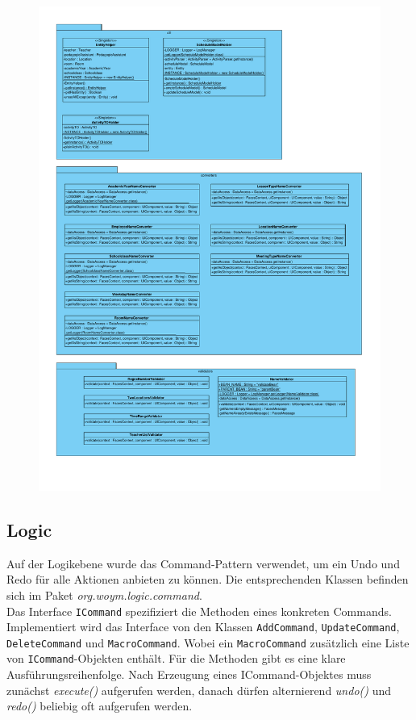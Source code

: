 \documentclass[fontsize=12pt,paper=a4,twoside]{scrartcl}
\begin{document}
\begin{figure}[H]
\centering
\includegraphics[width=\textwidth]{ui.pdf}
\end{figure}

\subsection{Logic}
\label{subsec:logic}
Auf der Logikebene wurde das Command-Pattern verwendet, um ein Undo und Redo für alle Aktionen anbieten zu können. Die entsprechenden Klassen befinden sich im Paket \textit{org.woym.logic.command}. \\
Das Interface \texttt{ICommand} spezifiziert die Methoden eines konkreten Commands. Implementiert wird das Interface von den Klassen \texttt{AddCommand}, \texttt{UpdateCommand}, \texttt{DeleteCommand} und \texttt{MacroCommand}. Wobei ein \texttt{MacroCommand} zusätzlich eine Liste von \texttt{ICommand}-Objekten enthält. Für die Methoden gibt es eine klare Ausführungsreihenfolge. Nach Erzeugung eines ICommand-Objektes muss zunächst \textit{execute()} aufgerufen werden, danach dürfen alternierend \textit{undo()} und \textit{redo()} beliebig oft aufgerufen werden. \\
\end{document}

